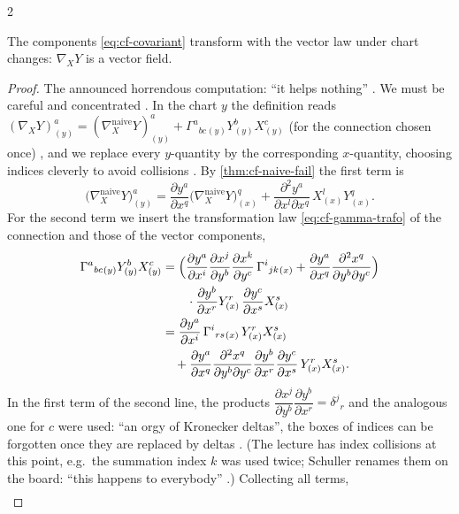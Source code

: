 \begin{paracol}{2}
\begin{theorem}\label{thm:cf-covariant}
The components \eqref{eq:cf-covariant} transform with the vector law under chart changes: $\nabla_XY$ is a vector field.
\end{theorem}
\begin{proof}
The announced horrendous computation: ``it helps nothing'' . We must be careful and concentrated
. In the chart $y$ the definition reads
$(\nabla_XY)^a_{(y)}=(\nabla^{\text{naive}}_XY)^a_{(y)}+\Gamma^a{}_{bc}{}_{(y)}Y^b_{(y)}X^c_{(y)}$
(for the connection chosen once) , and we replace every $y$-quantity by the corresponding $x$-quantity, choosing indices
cleverly to avoid collisions .
By \cref{thm:cf-naive-fail} the first term is
\[
  \bigl(\nabla^{\text{naive}}_XY\bigr)^a_{(y)}
  =\frac{\partial y^a}{\partial x^q}\bigl(\nabla^{\text{naive}}_XY\bigr)^q_{(x)}
  +\frac{\partial^2y^a}{\partial x^l\partial x^q}\,X^l_{(x)}Y^q_{(x)}.
\]
For the second term we insert the transformation law \eqref{eq:cf-gamma-trafo} of the connection and those of the vector
components,
\begin{align*}
  \Gamma^a{}_{bc}{}_{(y)}Y^b_{(y)}X^c_{(y)}
  &=\Bigl(\frac{\partial y^a}{\partial x^i}\frac{\partial x^j}{\partial y^b}\frac{\partial x^k}{\partial y^c}\,\Gamma^i{}_{jk}{}_{(x)}
   +\frac{\partial y^a}{\partial x^q}\frac{\partial^2x^q}{\partial y^b\partial y^c}\Bigr)\\
  &\qquad\cdot\frac{\partial y^b}{\partial x^r}Y^r_{(x)}\,
   \frac{\partial y^c}{\partial x^s}X^s_{(x)}\\
  &=\frac{\partial y^a}{\partial x^i}\,\Gamma^i{}_{rs}{}_{(x)}\,Y^r_{(x)}X^s_{(x)}\\
  &\quad+\frac{\partial y^a}{\partial x^q}\frac{\partial^2x^q}{\partial y^b\partial y^c}\frac{\partial y^b}{\partial x^r}\frac{\partial y^c}{\partial x^s}\,Y^r_{(x)}X^s_{(x)} .
\end{align*}
In the first term of the second line, the products $\dfrac{\partial x^j}{\partial y^b}\dfrac{\partial y^b}{\partial x^r}=\delta^j{}_r$ and the
analogous one for $c$ were used: ``an orgy of Kronecker deltas'', the boxes of indices can be forgotten once they are replaced by deltas
. (The lecture has index collisions at this point, e.g.\ the summation index $k$ was used twice;
Schuller renames them on the board: ``this happens to everybody'' .)
Collecting all terms,
\begin{align*}

\end{align*}
\end{proof}
\end{paracol}
